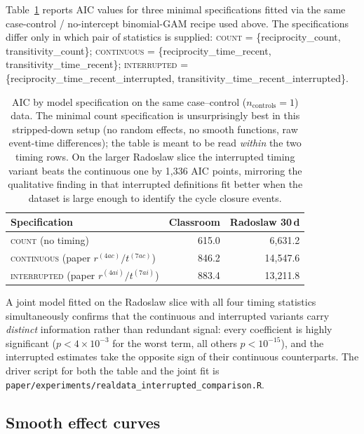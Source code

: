 \documentclass[11pt,a4paper]{article}
\begin{document}
Table~\ref{tab:realdata-aic} reports AIC values for three minimal
specifications fitted via the same case-control / no-intercept
binomial-GAM recipe used above. The specifications differ only in
which pair of statistics is supplied:
\textsc{count} = \{reciprocity\_count, transitivity\_count\};
\textsc{continuous} = \{reciprocity\_time\_recent,
transitivity\_time\_recent\};
\textsc{interrupted} = \{reciprocity\_time\_recent\_interrupted,
transitivity\_time\_recent\_interrupted\}.

\begin{table}[h]
\centering
\small
\begin{tabular}{lrr}
\toprule
Specification & Classroom & Radoslaw 30\,d \\
\midrule
\textsc{count} (no timing)             &  615.0 &  6{,}631.2 \\
\textsc{continuous} (paper $r^{(4ac)} / t^{(7ac)}$) &  846.2 & 14{,}547.6 \\
\textsc{interrupted} (paper $r^{(4ai)} / t^{(7ai)}$) &  883.4 & 13{,}211.8 \\
\bottomrule
\end{tabular}
\caption{AIC by model specification on the same case--control
($n_\text{controls}=1$) data. The minimal count specification is
unsurprisingly best in this stripped-down setup (no random effects,
no smooth functions, raw event-time differences); the table is
meant to be read \emph{within} the two timing rows. On the larger
Radoslaw slice the interrupted timing variant beats the continuous
one by 1{,}336 AIC points, mirroring the qualitative finding in
\citet[Table~3]{juozaitiene2024about} that interrupted definitions
fit better when the dataset is large enough to identify the cycle
closure events.}
\label{tab:realdata-aic}
\end{table}

A joint model fitted on the Radoslaw slice with all four timing
statistics simultaneously confirms that the continuous and
interrupted variants carry \emph{distinct} information rather than
redundant signal: every coefficient is highly significant
(\(p < 4 \times 10^{-3}\) for the worst term, all others
\(p < 10^{-15}\)), and the interrupted estimates take the opposite
sign of their continuous counterparts. The driver script for both
the table and the joint fit is
\texttt{paper/experiments/realdata\_interrupted\_comparison.R}.

\subsection{Smooth effect curves}\label{sec:smooth}
\end{document}
